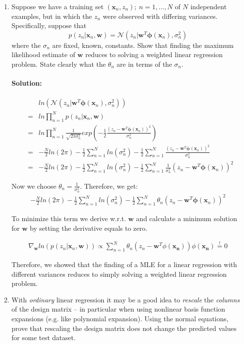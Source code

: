 \documentclass{article}
\renewcommand{\Vec}[1]{\ensuremath{\mathbf{#1}}}
\begin{document}
\begin{enumerate}
\item Suppose we have a training set ${(\Vec{x}_n, z_n);\ n = 1, \dots ,N}$ 
of $N$ independent examples, but in which the $z_n$ were observed with differing 
variances. Specifically, suppose that
\[
p(z_n|\Vec{x}_n,\Vec{w}) = \mathcal{N}(z_n|\Vec{w}^{T}\Vec{\phi}(\Vec{x}_n),\sigma_n^2)
\]
where the $\sigma_n$ are fixed, known, constants. Show that finding the maximum 
likelihood estimate of $\Vec{w}$ reduces to solving a weighted linear regression problem. 
State clearly what the $\theta_n$ are in terms of the $\sigma_n$.

\paragraph*{Solution:}
\begin{eqnarray}
&&ln (\mathcal{N}(z_n|\Vec{w}^{T}\Vec{\phi}(\Vec{x}_n),\sigma_n^2))\\
 &=& ln \prod^{N}_{n=1} p(z_n|\Vec{x}_n,\Vec{w}) \\
&=& ln \prod^{N}_{n=1} \frac{1}{\sqrt{2\pi \sigma_n^2}} exp\left(-\frac{1}{2} \frac{(z_n - \Vec{w}^{T}\Vec{\phi}(\Vec{x}_n))^2}{\sigma_n^2}\right)\\
&=& -\frac{N}{2} ln(2\pi)-\frac{1}{2} \sum^{N}_{n=1} ln(\sigma_n^2) -\frac{1}{2} \sum^{N}_{n=1} \frac{(z_n - \Vec{w}^{T}\Vec{\phi}(\Vec{x}_n))^2}{\sigma_n^2}\\
&=& -\frac{N}{2} ln(2\pi)-\frac{1}{2} \sum^{N}_{n=1} ln(\sigma_n^2) -\frac{1}{2} \sum^{N}_{n=1} \frac{1}{\sigma_n^2}(z_n - \Vec{w}^{T}\Vec{\phi}(\Vec{x}_n))^2
\end{eqnarray}

Now we choose $\theta_n = \frac{1}{\sigma_n^2}$. Therefore, we get:
\begin{eqnarray}
-\frac{N}{2} ln(2\pi)-\frac{1}{2} \sum^{N}_{n=1} ln(\sigma_n^2) -\frac{1}{2} \sum^{N}_{n=1} \theta_n (z_n - \Vec{w}^{T}\Vec{\phi}(\Vec{x}_n))^2
\end{eqnarray}

To minimize this term we derive w.r.t. $\Vec{w}$ and calculate a minimum solution for $\Vec{w}$ by setting the derivative equals to zero.

\begin{eqnarray}
\nabla_{\Vec{w}} ln(p(z_n|\Vec{x}_n,\Vec{w})) \propto \sum_{n=1}^N \theta_n (z_n - \Vec{w}^T\phi(\Vec{x_n}))\phi(\Vec{x_n}) \overset{!}{=} 0
\end{eqnarray}

Therefore, we showed that the finding of a MLE for a linear regression with different variances reduces to simply solving a weighted linear regression problem.

\item With \emph{ordinary} linear regression it may be a good idea to \emph{rescale} the
\emph{columns} of the design matrix -- in particular when using nonlinear basis function
expansions (e.g. like polynomial expansion). Using the normal equations, prove that rescaling
the design matrix does not change the predicted values for some test dataset.
\end{enumerate}
\end{document}
